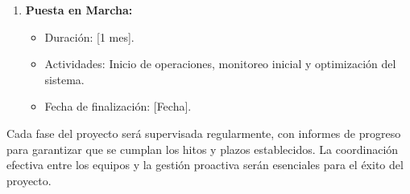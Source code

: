 \documentclass[11pt,a4paper]{article}  %
\begin{document}
\begin{enumerate}
    \item \textbf{Puesta en Marcha:}
    \begin{itemize}
        \item Duración: [1 mes].
        \item Actividades: Inicio de operaciones, monitoreo inicial y optimización del sistema.
        \item Fecha de finalización: [Fecha].
    \end{itemize}
\end{enumerate}

Cada fase del proyecto será supervisada regularmente, con informes de progreso para garantizar que se cumplan los hitos y plazos establecidos. La coordinación efectiva entre los equipos y la gestión proactiva serán esenciales para el éxito del proyecto.
\end{document}
